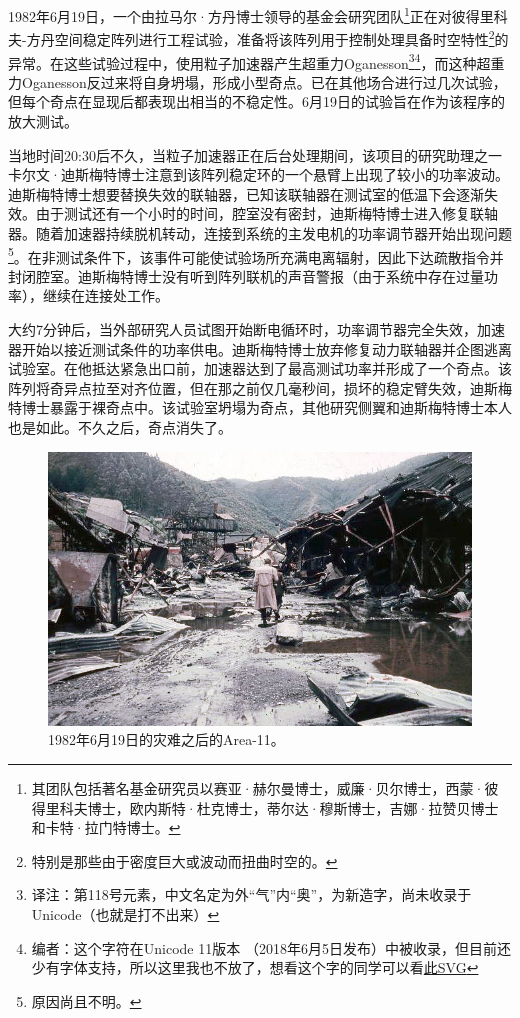 1982年6月19日，一个由拉马尔·方丹博士领导的基金会研究团队\footnote{其团队包括著名基金研究员以赛亚·赫尔曼博士，威廉·贝尔博士，西蒙·彼得里科夫博士，欧内斯特·杜克博士，蒂尔达·穆斯博士，吉娜·拉赞贝博士和卡特·拉门特博士。}正在对彼得里科夫-方丹空间稳定阵列进行工程试验，准备将该阵列用于控制处理具备时空特性\footnote{特别是那些由于密度巨大或波动而扭曲时空的。}的异常。在这些试验过程中，使用粒子加速器产生超重力Oganesson\footnote{译注：第118号元素，中文名定为外“气”内“奥”，为新造字，尚未收录于Unicode（也就是打不出来）}\footnote{编者\QIS：这个字符在Unicode 11版本 （2018年6月5日发布）中被收录，但目前还少有字体支持，所以这里我也不放了，想看这个字的同学可以看\href{http://www.fileformat.info/info/unicode/char/9feb/sample.svg}{此SVG}}，而这种超重力Oganesson反过来将自身坍塌，形成小型奇点。已在其他场合进行过几次试验，但每个奇点在显现后都表现出相当的不稳定性。6月19日的试验旨在作为该程序的放大测试。

当地时间20:30后不久，当粒子加速器正在后台处理期间，该项目的研究助理之一卡尔文·迪斯梅特博士注意到该阵列稳定环的一个悬臂上出现了较小的功率波动。迪斯梅特博士想要替换失效的联轴器，已知该联轴器在测试室的低温下会逐渐失效。由于测试还有一个小时的时间，腔室没有密封，迪斯梅特博士进入修复联轴器。随着加速器持续脱机转动，连接到系统的主发电机的功率调节器开始出现问题\footnote{原因尚且不明。}。在非测试条件下，该事件可能使试验场所充满电离辐射，因此下达疏散指令并封闭腔室。迪斯梅特博士没有听到阵列联机的声音警报（由于系统中存在过量功率），继续在连接处工作。

大约7分钟后，当外部研究人员试图开始断电循环时，功率调节器完全失效，加速器开始以接近测试条件的功率供电。迪斯梅特博士放弃修复动力联轴器并企图逃离试验室。在他抵达紧急出口前，加速器达到了最高测试功率并形成了一个奇点。该阵列将奇异点拉至对齐位置，但在那之前仅几毫秒间，损坏的稳定臂失效，迪斯梅特博士暴露于裸奇点中。该试验室坍塌为奇点，其他研究侧翼和迪斯梅特博士本人也是如此。不久之后，奇点消失了。

\begin{figure}[H]
    \centering
    \includegraphics[width=0.5\linewidth]{images/SCP-001-atonement-7.png}
    \caption*{1982年6月19日的灾难之后的Area-11。}
\end{figure}

